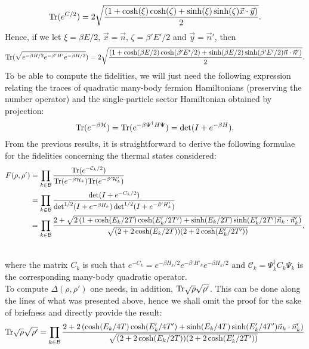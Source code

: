 \begin{equation}
\text{Tr}(e^{C/2})=2\sqrt{\frac{(1+\cosh(\xi)\cosh(\zeta)+\sinh(\xi)\sinh(\zeta)\vec{x}\cdot\vec{y})}{2}}.
\end{equation}
Hence, if we let $\xi= \beta E/2$, $\vec{x}=\vec{n}$, $\zeta=\beta' E'/2$ and $\vec{y}=\vec{n}'$, then
\begin{equation}
\text{Tr}(\sqrt{e^{-\beta H/2}e^{-\beta' H'}e^{-\beta H/2}})=2\sqrt{\frac{(1+\cosh(\beta E/2 )\cosh(\beta'E'/2)+\sinh(\beta E/2)\sinh(\beta'E'/2)\vec{n}\cdot\vec{n}')}{2}}.
\end{equation}
To be able to compute the fidelities, we will just need the following expression relating the traces of quadratic many-body fermion Hamiltonians (preserving the number operator) and the single-particle sector Hamiltonian obtained by projection:
\begin{equation}
\text{Tr}(e^{-\beta \mathcal{H}})=\text{Tr}(e^{-\beta \Psi^{\dagger}H\Psi})=\det(I+e^{-\beta H}).
\end{equation}
From the previous results, it is straightforward to derive the following formulae for the fidelities concerning the thermal states considered:\\

\begin{eqnarray}
	F(\rho,\rho')&=\prod_{k\in\mathcal{B}}\frac{\text{Tr}(e^{-\mathcal{C}_k/2})}{\text{Tr}(e^{-\beta \mathcal{H}_k})\text{Tr}(e^{-\beta' \mathcal{H}'_k})}\nonumber\\
	&=\prod_{k\in\mathcal{B}}\frac{\det(I+e^{-C_k/2})}{\det^{1/2}(I+e^{-\beta H_k})\det^{1/2}(I+e^{-\beta' H'_k})}\nonumber\\
	&=\prod_{k\in\mathcal{B}}\frac{2+\sqrt{2\left(1+\cosh(E_k/2T)\cosh(E'_k/2T')+\sinh(E_k/2T)\sinh(E'_k/2T')\vec{n}_k\cdot\vec{n}'_k\right)}}{\sqrt{(2+ 2\cosh (E_k/2T))(2+2\cosh (E'_k/2T'))}},\\
	\nonumber
\end{eqnarray}
		
where the matrix $C_k$ is such that $e^{-C_k}=e^{-\beta H_k/2}e^{-\beta' H'_k}e^{-\beta H_k/2}$ and $\mathcal{C}_k=\Psi_k^{\dagger}C_k\Psi_k$ is the corresponding many-body quadratic operator. \\

To compute $\Delta(\rho,\rho')$ one needs, in addition, $\text{Tr} \sqrt{\rho}\sqrt{\rho'}$. This can be done along the lines of what was presented above, hence we shall omit the proof for the sake of briefness and directly provide the result: 
\begin{equation}
\text{Tr} \sqrt{\rho}\sqrt{\rho'}=\prod_{k\in \mathcal{B}}\frac{2+2\left(\cosh(E_k/4T)\cosh(E'_k/4T')+\sinh(E_k/4T)\sinh(E'_k/4T')\vec{n}_k\cdot\vec{n}'_k\right)}{\sqrt{(2+ 2\cosh (E_k/2T))(2+2\cosh (E'_k/2T'))}}
\end{equation}
 

%
%
%
%
%
%
%